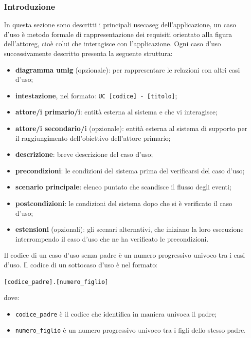 \subsubsection{Introduzione}
In questa sezione sono descritti i principali \gls{usecaseg} dell'applicazione, un caso d'uso è metodo formale di rappresentazione dei requisiti orientato alla figura dell'\gls{attoreg}, cioè colui che interagisce con l'applicazione. Ogni caso d'uso successivamente descritto presenta la seguente struttura:
\begin{itemize}
    \item \textbf{diagramma \gls{umlg}} (opzionale): per rappresentare le relazioni con altri casi d'uso;
    \item \textbf{intestazione}, nel formato: \texttt{UC [codice] - [titolo]};
    \item \textbf{attore/i primario/i}: entità esterna al sistema e che vi interagisce;
    \item \textbf{attore/i secondario/i} (opzionale): entità esterna al sistema di supporto per il raggiungimento
dell'obiettivo dell'attore primario;
    \item \textbf{descrizione}: breve descrizione del caso d'uso;
    \item \textbf{precondizioni}: le condizioni del sistema prima del verificarsi del caso d'uso;
    \item \textbf{scenario principale}: elenco puntato che scandisce il flusso degli eventi;
    \item \textbf{postcondizioni}: le condizioni del sistema dopo che si è verificato il caso d'uso;
    \item \textbf{estensioni} (opzionali): gli scenari alternativi, che iniziano la loro esecuzione interrompendo il caso d'uso che ne ha verificato le precondizioni.
\end{itemize}

\noindent Il codice di un caso d'uso senza padre è un numero progressivo univoco tra i casi d'uso. Il codice di un sottocaso d'uso è nel formato: \begin{center} \texttt{[codice\_padre].[numero\_figlio]} \end{center}
\noindent dove:
\begin{itemize}
    \item \texttt{codice\_padre} è il codice che identifica in maniera univoca il padre;
    \item \texttt{numero\_figlio} è un numero progressivo univoco tra i figli dello stesso padre.
\end{itemize}
        
